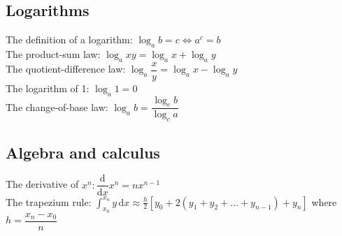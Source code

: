 \documentclass[class=exam, crop=false, 12pt]{standalone}
\begin{document}
\subsection*{Logarithms}
The definition of a logarithm: $\log_{a}{b} = c \Leftrightarrow a^{c} = b$\vspace{0.1in}\\
The product-sum law: $\log_{a}{xy} = \log_{a}{x}+\log_{a}{y}$\vspace{0.1in}\\
The quotient-difference law: $\log_{a}{\dfrac{x}{y}} = \log_{a}{x} - \log_{a}{y}$\vspace{0.1in}\\
The logarithm of 1: $\log_{a}{1} = 0$ \vspace{0.1in}\\
The change-of-base law: $\log_{a}{b} = \dfrac{\log_{c}{b}}{\log_{c}{a}}$


\subsection*{Algebra and calculus}
The derivative of $x^{n} : \dfrac{\text{d}}{\text{d}x} x^{n} = nx^{n-1}$\vspace{0.1in}\\
The trapezium rule: $\int_{x_{0}}^{x_{n}}y \, \text{d}x \approx \frac{h}{2} \left[ y_{0} + 2(y_{1}+y_{2} + \dots + y_{n-1}) + y_{n} \right]$ where $h = 
\dfrac{x_{n} - x_{0}}{n}$
\end{document}
